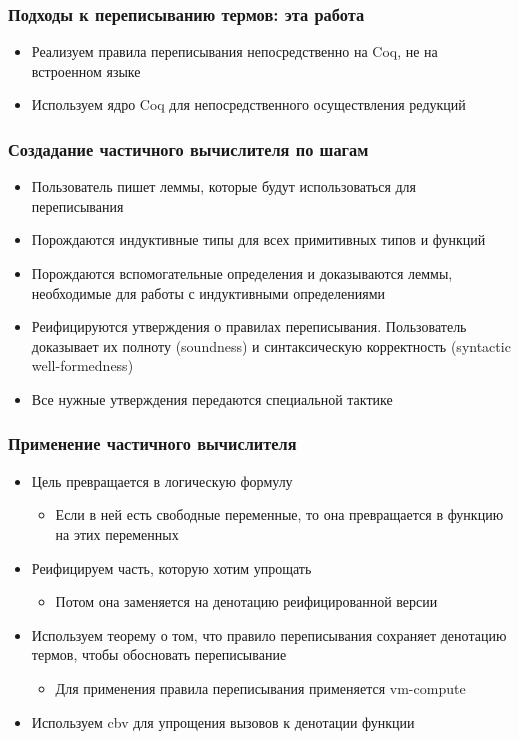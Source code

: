 \documentclass[xcolor=table]{beamer}
\begin{document}
\begin{frame}[fragile]
  \transwipe[direction=90]
  \frametitle{Подходы к переписыванию термов: эта работа}
  \begin{itemize}
    \item Реализуем правила переписывания непосредственно на Coq, не на встроенном языке
    \item Используем ядро Coq для непосредственного осуществления редукций
  \end{itemize}
\end{frame}

\begin{frame}[fragile]
  \transwipe[direction=90]
  \frametitle{Создадание частичного вычислителя по шагам}
  \begin{itemize}
    \item Пользователь пишет леммы, которые будут использоваться для переписывания
    \item Порождаются индуктивные типы для всех примитивных типов и функций
    \item Порождаются вспомогательные определения и доказываются леммы, необходимые для работы с индуктивными определениями
    \item Реифицируются утверждения о правилах переписывания. Пользователь доказывает их полноту (soundness) и синтаксическую корректность (syntactic well-formedness)
    \item Все нужные утверждения передаются специальной тактике
  \end{itemize}
\end{frame}

\begin{frame}[fragile]
  \transwipe[direction=90]
  \frametitle{Применение частичного вычислителя}
  \begin{itemize}
    \item Цель превращается в логическую формулу
    \begin{itemize}
      \item Если в ней есть свободные переменные, то она превращается в функцию на этих переменных
    \end{itemize}
    \item Реифицируем часть, которую хотим упрощать
    \begin{itemize}
      \item Потом она заменяется на денотацию реифицированной версии
    \end{itemize}
    \item Используем теорему о том, что правило переписывания сохраняет денотацию термов, чтобы обосновать переписывание
    \begin{itemize}
      \item Для применения правила переписывания применяется vm-compute
    \end{itemize}
    \item Используем cbv для упрощения вызовов к денотации функции
  \end{itemize}
\end{frame}
\end{document}

